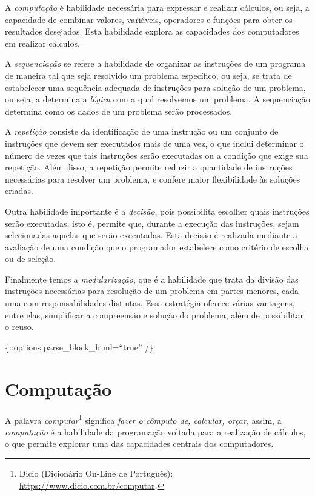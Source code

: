 \documentclass[
]{book}
\begin{document}
A \emph{computação} é habilidade necessária para expressar e realizar cálculos, ou seja, a capacidade de combinar valores, variáveis, operadores e funções para obter os resultados desejados. Esta habilidade explora as capacidades dos computadores em realizar cálculos.

A \emph{sequenciação} se refere a habilidade de organizar as instruções de um programa de maneira tal que seja resolvido um problema específico, ou seja, se trata de estabelecer uma sequência adequada de instruções para solução de um problema, ou seja, a determina a \emph{lógica} com a qual resolvemos um problema. A sequenciação determina como os dados de um problema serão processados.

A \emph{repetição} consiste da identificação de uma instrução ou um conjunto de instruções que devem ser executados mais de uma vez, o que inclui determinar o número de vezes que tais instruções serão executadas ou a condição que exige sua repetição. Além disso, a repetição permite reduzir a quantidade de instruções necessárias para resolver um problema, e confere maior flexibilidade às soluções criadas.

Outra habilidade importante é a \emph{decisão}, pois possibilita escolher quais instruções serão executadas, isto é, permite que, durante a execução das instruções, sejam selecionadas aquelas que serão executadas. Esta decisão é realizada mediante a avaliação de uma condição que o programador estabelece como critério de escolha ou de seleção.

Finalmente temos a \emph{modularização}, que é a habilidade que trata da divisão das instruções necessárias para resolução de um problema em partes menores, cada uma com responsabilidades distintas. Essa estratégia oferece várias vantagens, entre elas, simplificar a compreensão e solução do problema, além de possibilitar o reuso.

\{::options parse\_block\_html=``true'' /\}

\hypertarget{comput}{%
\chapter{Computação}\label{comput}}

A palavra \emph{computar}\footnote{Dicio (Dicionário On-Line de Português): \url{https://www.dicio.com.br/computar}.} significa \emph{fazer o cômputo de, calcular, orçar}, assim, a \emph{computação} é a habilidade da programação voltada para a realização de cálculos, o que permite explorar uma das capacidades centrais dos computadores.
\end{document}
